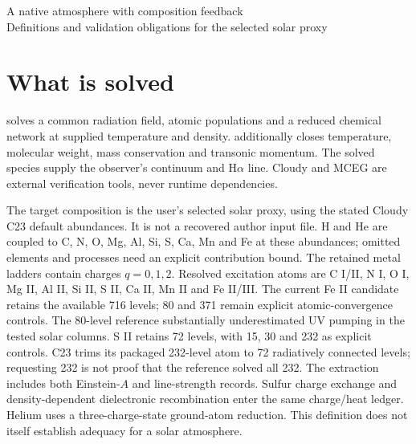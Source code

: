 \documentclass[10pt,a4paper]{article}
\begin{document}
\begin{center}
{\Large A native atmosphere with composition feedback}\\[4pt]
Definitions and validation obligations for the selected solar proxy
\end{center}

\section{What is solved}
 solves a common radiation field,
atomic populations and a reduced chemical network at supplied temperature
and density.  additionally closes
temperature, molecular weight, mass conservation and transonic momentum.
The solved species supply the observer's continuum and H$\alpha$ line.
Cloudy and MCEG are external verification tools, never runtime dependencies.

The target composition is the user's selected solar proxy, using the stated
Cloudy C23 default abundances. It is not a recovered author input file.
H and He are coupled to C, N, O, Mg, Al, Si, S, Ca, Mn and Fe at these abundances;
omitted elements and processes need an explicit contribution bound.
The retained metal ladders contain charges $q=0,1,2$. Resolved excitation
atoms are C I/II, N I, O I, Mg II, Al II, Si II, S II, Ca II, Mn II and Fe II/III.
The current Fe II candidate retains the available 716 levels; 80 and 371
remain explicit atomic-convergence controls. The 80-level reference
substantially underestimated UV pumping in the tested solar columns.
S II retains 72 levels, with 15, 30 and 232 as explicit controls. C23 trims
its packaged 232-level atom to 72 radiatively connected levels; requesting
232 is not proof that the reference solved all 232. The extraction includes
both Einstein-$A$ and line-strength records. Sulfur charge exchange and
density-dependent dielectronic recombination enter the same charge/heat ledger.
Helium uses a three-charge-state ground-atom reduction. This definition
does not itself establish adequacy for a solar atmosphere.
\end{document}
